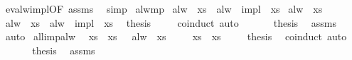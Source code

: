 \begin{isabellebody}
%
\isadelimproof
%
\endisadelimproof
%
\isatagproof
{}\isamarkupfalse%
\ ev{\isacharunderscore}alw{\isacharunderscore}impl{\isacharbrackleft}OF\ assms{\isacharbrackright}\ \isamarkupfalse%
\ simp%
\endisatagproof
{\isafoldproof}%
%
\isadelimproof
\isanewline
%
\endisadelimproof
\isanewline
{}\isamarkupfalse%
\ alw{\isacharunderscore}mp{\isacharcolon}\isanewline
{}\ {\isachardoublequoteopen}alw\ {\isasymphi}\ xs{\isachardoublequoteclose}\ \ {\isachardoublequoteopen}alw\ {\isacharparenleft}{\isasymphi}\ impl\ {\isasympsi}{\isacharparenright}\ xs{\isachardoublequoteclose}\isanewline
{}\ {\isachardoublequoteopen}alw\ {\isasympsi}\ xs{\isachardoublequoteclose}\isanewline
%
\isadelimproof
%
\endisadelimproof
%
\isatagproof
{}\isamarkupfalse%
{\isacharminus}\isanewline
\ \ \isacommand{{\isacharbraceleft}}\isamarkupfalse%
\isamarkupfalse%
\ {\isachardoublequoteopen}alw\ {\isasymphi}\ xs\ {\isasymand}\ alw\ {\isacharparenleft}{\isasymphi}\ impl\ {\isasympsi}{\isacharparenright}\ xs{\isachardoublequoteclose}\ \isamarkupfalse%
\ {\isacharquery}thesis\isanewline
\ \ \ \isamarkupfalse%
\ coinduct\ auto\isanewline
\ \ \isacommand{{\isacharbraceright}}\isamarkupfalse%
\isanewline
\ \ \isamarkupfalse%
\ {\isacharquery}thesis\ \isamarkupfalse%
\ assms\ \isamarkupfalse%
\ auto\isanewline
{}\isamarkupfalse%
%
\endisatagproof
{\isafoldproof}%
%
\isadelimproof
\isanewline
%
\endisadelimproof
\isanewline
{}\isamarkupfalse%
\ all{\isacharunderscore}imp{\isacharunderscore}alw{\isacharcolon}\isanewline
{}\ {\isachardoublequoteopen}{\isasymAnd}\ xs{\isachardot}\ {\isasymphi}\ xs{\isachardoublequoteclose}\ \ \ {\isachardoublequoteopen}alw\ {\isasymphi}\ xs{\isachardoublequoteclose}\isanewline
%
\isadelimproof
%
\endisadelimproof
%
\isatagproof
{}\isamarkupfalse%
{\isacharminus}\isanewline
\ \ \isacommand{{\isacharbraceleft}}\isamarkupfalse%
\isamarkupfalse%
\ {\isachardoublequoteopen}{\isasymforall}\ xs{\isachardot}\ {\isasymphi}\ xs{\isachardoublequoteclose}\isanewline
\ \ \ \isamarkupfalse%
\ {\isacharquery}thesis\ \isamarkupfalse%
\ coinduct\ auto\isanewline
\ \ \isacommand{{\isacharbraceright}}\isamarkupfalse%
\isanewline
\ \ \isamarkupfalse%
\ {\isacharquery}thesis\ \isamarkupfalse%
\ assms\ \isamarkupfalse%

\end{isabellebody}
